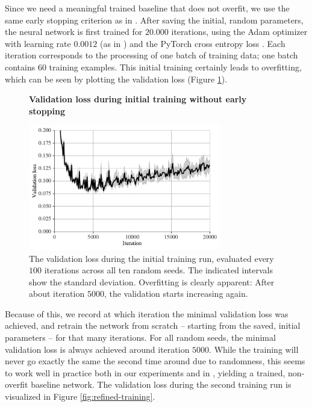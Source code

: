 \documentclass[12pt,final,twoside]{article}
\theoremstyle{plain}
\theoremstyle{definition}
\theoremstyle{remark}
\theoremstyle{named}
\begin{document}
Since we need a meaningful trained baseline that does not overfit, we use the same early stopping criterion as in \cite{supermask}. After saving the initial, random parameters, the neural network is first trained for $20.000$ iterations, using the Adam optimizer \cite{adam} with learning rate $0.0012$ (as in \cite{supermask}) and the PyTorch cross entropy loss \cite{pytorch}. Each iteration corresponds to the processing of one batch of training data; one batch contains $60$ training examples. This initial training certainly leads to overfitting, which can be seen by plotting the validation loss (Figure \ref{fig:initial-training}).

\begin{figure}[h!]
  \centering
  \textbf{Validation loss during initial training without early stopping}\par\medskip
  \includegraphics[width=0.75\textwidth]{plots/initial_trainings.pdf}
  \caption{The validation loss during the initial training run, evaluated every $100$ iterations across all ten random seeds. The indicated intervals show the standard deviation. Overfitting is clearly apparent: After about iteration $5000$, the validation starts increasing again.}
  \label{fig:initial-training}
\end{figure}

Because of this, we record at which iteration the minimal validation loss was achieved, and retrain the network from scratch -- starting from the saved, initial parameters -- for that many iterations. For all random seeds, the minimal validation loss is always achieved around iteration $5000$. While the training will never go exactly the same the second time around due to randomness, this seems to work well in practice both in our experiments and in \cite{supermask}, yielding a trained, non-overfit baseline network. The validation loss during the second training run is visualized in Figure \ref{fig:refined-training}.
\end{document}
